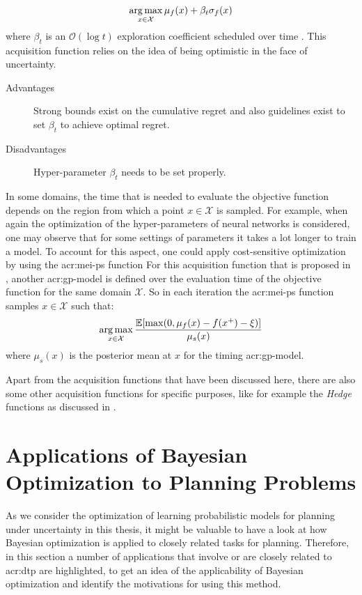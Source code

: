 \begin{description}
	$$\operatorname*{arg\,max}_{x \in \mathcal{X}} \mu_f(x) + \beta_t\sigma_f(x)$$
	where $\beta_t$ is an $\mathcal{O}(\log{t})$ exploration coefficient scheduled over time \cite{perchet2014gaussian}. This acquisition function relies on the idea of being optimistic in the face of uncertainty.
	\begin{description}
		\item[Advantages] Strong bounds exist on the cumulative regret and also guidelines exist to set $\beta_t$ to achieve optimal regret.
		\item[Disadvantages] Hyper-parameter $\beta_t$ needs to be set properly.
	\end{description}
\end{description}

In some domains, the time that is needed to evaluate the objective function depends on the region from which a point $x \in \mathcal{X}$ is sampled.
For example, when again the optimization of the hyper-parameters of neural networks is considered, one may observe that for some settings of parameters it takes a lot longer to train a model.
To account for this aspect, one could apply cost-sensitive optimization by using the \acrfull{acr:mei-ps} function
For this acquisition function that is proposed in \cite{snoek2012practical}, another \acrshort{acr:gp}-model is defined over the evaluation time of the objective function for the same domain $\mathcal{X}$.
So in each iteration the \acrshort{acr:mei-ps} function samples $x \in \mathcal{X}$ such that:
$$\operatorname*{arg\,max}_{x \in \mathcal{X}} \frac{\mathbb{E}[\max(0, \mu_f(x) - f(x^+) - \xi)]}{\mu_s(x)}$$
where $\mu_s(x)$ is the posterior mean at $x$ for the timing \acrshort{acr:gp}-model.

Apart from the acquisition functions that have been discussed here, there are also some other acquisition functions for specific purposes, like for example the \textit{Hedge} functions as discussed in \cite{hoffman2011portfolio}.


\section{Applications of Bayesian Optimization to Planning Problems}
\label{sec:bayesian-optimization-applications}

As we consider the optimization of learning probabilistic models for planning under uncertainty in this thesis, it might be valuable to have a look at how Bayesian optimization is applied to closely related tasks for planning.
Therefore, in this section a number of applications that involve or are closely related to \acrshort{acr:dtp} are highlighted, to get an idea of the applicability of Bayesian optimization and identify the motivations for using this method.

